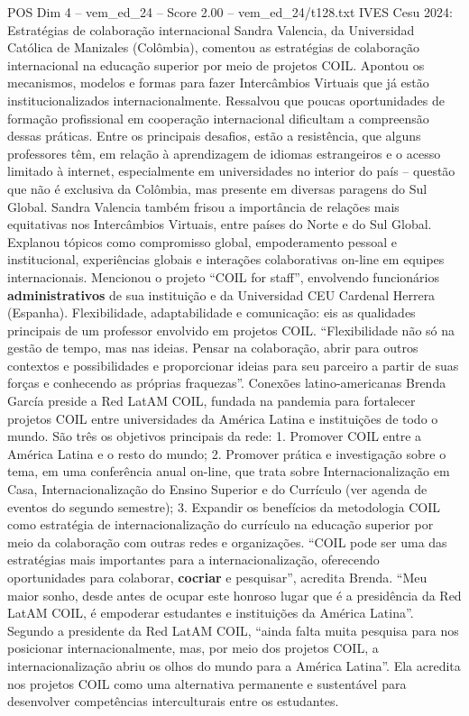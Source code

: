 \begin{textsample}{POS Dim 4 – vem\_ed\_24 – Score 2.00 – vem\_ed\_24/t128.txt}  \label{ex:f4_pos_106}
IVES Cesu 2024: Estratégias de colaboração internacional Sandra Valencia, da Universidad Católica de Manizales (Colômbia), comentou as estratégias de colaboração internacional na educação superior por meio de projetos COIL.
Apontou os mecanismos, modelos e formas para fazer Intercâmbios Virtuais que já estão institucionalizados internacionalmente.
Ressalvou que poucas oportunidades de formação profissional em cooperação internacional dificultam a compreensão dessas práticas.
Entre os principais desafios, estão a resistência, que alguns professores têm, em relação à aprendizagem de idiomas estrangeiros e o acesso limitado à internet, especialmente em universidades no interior do país – questão que não é exclusiva da Colômbia, mas presente em diversas paragens do Sul Global.
Sandra Valencia também frisou a importância de relações mais equitativas nos Intercâmbios Virtuais, entre países do Norte e do Sul Global.
Explanou tópicos como compromisso global, empoderamento pessoal e institucional, experiências globais e interações colaborativas on-line em equipes internacionais.
Mencionou o projeto “COIL for staff”, envolvendo funcionários \textbf{administrativos} de sua instituição e da Universidad CEU Cardenal Herrera (Espanha).
Flexibilidade, adaptabilidade e comunicação: eis as qualidades principais de um professor envolvido em projetos COIL. “Flexibilidade não só na gestão de tempo, mas nas ideias.
Pensar na colaboração, abrir para outros contextos e possibilidades e proporcionar ideias para seu parceiro a partir de suas forças e conhecendo as próprias fraquezas”.
Conexões latino-americanas Brenda García preside a Red LatAM COIL, fundada na pandemia para fortalecer projetos COIL entre universidades da América Latina e instituições de todo o mundo.
São três os objetivos principais da rede: 1.
Promover COIL entre a América Latina e o resto do mundo; 2.
Promover prática e investigação sobre o tema, em uma conferência anual on-line, que trata sobre Internacionalização em Casa, Internacionalização do Ensino Superior e do Currículo (ver agenda de eventos do segundo semestre); 3.
Expandir os benefícios da metodologia COIL como estratégia de internacionalização do currículo na educação superior por meio da colaboração com outras redes e organizações. “COIL pode ser uma das estratégias mais importantes para a internacionalização, oferecendo oportunidades para colaborar, \textbf{cocriar} e pesquisar”, acredita Brenda. “Meu maior sonho, desde antes de ocupar este honroso lugar que é a presidência da Red LatAM COIL, é empoderar estudantes e instituições da América Latina”.
Segundo a presidente da Red LatAM COIL, “ainda falta muita pesquisa para nos posicionar internacionalmente, mas, por meio dos projetos COIL, a internacionalização abriu os olhos do mundo para a América Latina”.
Ela acredita nos projetos COIL como uma alternativa permanente e sustentável para desenvolver competências interculturais entre os estudantes.

\end{textsample}
